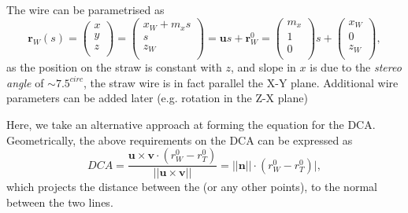 \documentclass[a4paper,11pt]{article}
\begin{document}
The wire can be parametrised as 
\begin{equation}
\textbf{r}_W(s) = \begin{pmatrix}x\\y\\z\\\end{pmatrix} = \begin{pmatrix}x_W + m_x s\\ s\\  z_W\\\end{pmatrix} = \textbf{u}s+\textbf{r}_W^0=\begin{pmatrix} m_x \\ 1\\  0\\\end{pmatrix}s + \begin{pmatrix}x_W  \\0 \\  z_W\\\end{pmatrix},
\label{eq:wire}
\end{equation}
as the position on the straw is constant with $z$, and slope in $x$ is due to the \textit{stereo angle} of $\sim 7.5^{circ}$, the straw wire is in fact parallel the X-Y plane. Additional wire parameters can be added later (e.g. rotation in the Z-X plane)

Here, we take an alternative approach at forming the equation for the DCA. Geometrically, the above requirements on the DCA can be expressed as
\begin{equation}
DCA = \frac{\textbf{u} \times \textbf{v} \cdot (r^0_W - r^0_T) }{||\textbf{u} \times \textbf{v}||} = ||\textbf{n}|| \cdot (r^0_W - r^0_T) |,
\end{equation}
which projects the distance between the  (or any other points), to the normal between the two lines.
\end{document}
